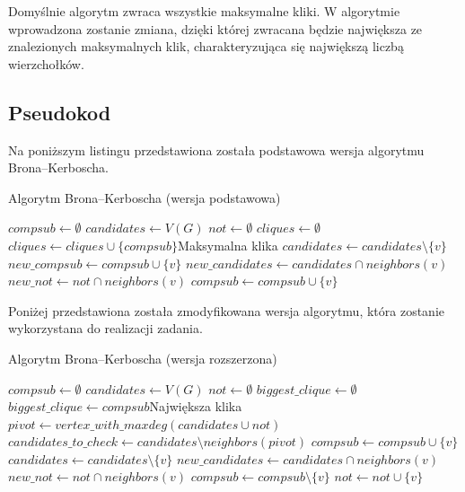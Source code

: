 \documentclass[12pt, a4paper]{article}
\begin{document}
Domyślnie algorytm zwraca wszystkie maksymalne kliki. W algorytmie wprowadzona zostanie zmiana, dzięki której zwracana będzie największa ze znalezionych maksymalnych klik, charakteryzująca się największą liczbą wierzchołków.

\subsection{Pseudokod}
Na poniższym listingu przedstawiona została podstawowa wersja algorytmu Brona--Kerboscha. 
\begin{algorithm}[!htb]
\caption{Algorytm Brona--Kerboscha (wersja podstawowa)}\label{bron1}
\begin{algorithmic}[1]
\State $compsub \gets \emptyset$
\State $candidates \gets V(G)$
\State $not \gets \emptyset$
\State $cliques \gets \emptyset$
		 \State $cliques \gets cliques \cup \{compsub\}$\Comment Maksymalna klika
	\Else
		\State $candidates \gets candidates \setminus \{v\}$
		\State $new\_compsub \gets compsub \cup \{v\}$
		\State $new\_candidates \gets candidates \cap neighbors(v)$
		\State $new\_not \gets not \cap neighbors(v)$
		\State{}
		\State $compsub \gets compsub \cup \{v\}$
	\EndFor
	\EndIf
\EndFunction
\end{algorithmic}
\end{algorithm}

Poniżej przedstawiona została zmodyfikowana wersja algorytmu, która zostanie wykorzystana do realizacji zadania.
\begin{algorithm}[!htb]
\caption{Algorytm Brona--Kerboscha (wersja rozszerzona)}\label{bron2}
\begin{algorithmic}[1]
\State $compsub \gets \emptyset$
\State $candidates \gets V(G)$
\State $not \gets \emptyset$
\State $biggest\_clique \gets \emptyset$
		 	\State $biggest\_clique \gets compsub$\Comment Największa klika
		 \EndIf
	\Else
	\State $pivot \gets vertex\_with\_maxdeg(candidates \cup not)$
	\State $candidates\_to\_check \gets candidates \setminus neighbors(pivot)$
		\State $compsub \gets compsub \cup \{v\}$
		\State $candidates \gets candidates \setminus \{v\}$
		\State $new\_candidates \gets candidates \cap neighbors(v)$
		\State $new\_not \gets not \cap neighbors(v)$
		\State{}
		\State $compsub \gets compsub \setminus \{v\}$
		\State $not \gets not \cup \{v\}$
	\EndFor
	\EndIf
\EndFunction
\end{algorithmic}
\end{algorithm}
\end{document}
